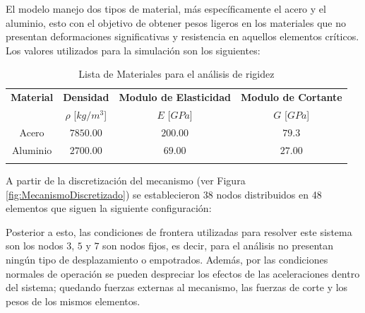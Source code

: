 El modelo manejo dos tipos de material, más específicamente el acero y el aluminio, esto con el objetivo de obtener pesos ligeros en los materiales que no presentan deformaciones significativas y resistencia en aquellos elementos críticos. Los valores utilizados para la simulación son los siguientes:

\begin{longtable}{|c|c|c|c|}
    \hline \rowcolor[gray]{0.85}
    \textbf{Material} & \textbf{Densidad} & \textbf{Modulo de Elasticidad} & \textbf{Modulo de Cortante} \\ \rowcolor[gray]{0.85}
     & $\rho$ [$kg/m^3$] & $E$ [$GPa$] & $G$ [$GPa$] \\ \hline
     Acero & $7850.00$ & $200.00$ & $79.3$ \\ \hline
     Aluminio & $2700.00$ & $69.00$ & $27.00$ \\ \hline
     \caption{Lista de Materiales para el análisis de rigidez}
\end{longtable}

A partir de la discretización del mecanismo (ver Figura \ref{fig:MecanismoDiscretizado}) se establecieron 38 nodos distribuidos en 48 elementos que siguen la siguiente configuración:



Posterior a esto, las condiciones de frontera utilizadas para resolver este sistema son los nodos $3$, $5$ y $7$ son nodos fijos, es decir, para el análisis no presentan ningún tipo de desplazamiento o empotrados. Además, por las condiciones normales de operación se pueden despreciar los efectos de las aceleraciones dentro del sistema; quedando fuerzas externas al mecanismo, las fuerzas de corte y los pesos de los mismos elementos.